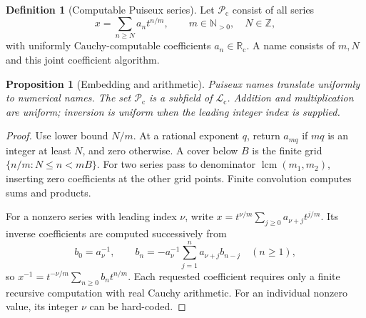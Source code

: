 \documentclass[11pt,letterpaper]{article}
\numberwithin{equation}{section}
\newtheorem{proposition}[theorem]{Proposition}
\theoremstyle{definition}
\newtheorem{definition}[theorem]{Definition}
\theoremstyle{remark}
\newcommand{\Rc}{\mathbb R_{\mathrm c}}
\newcommand{\Lc}{\mathcal L_{\mathrm c}}
\newcommand{\Pc}{\mathcal P_{\mathrm c}}
\newcommand{\N}{\mathbb N}
\newcommand{\Z}{\mathbb Z}
\DeclareMathOperator{\lcm}{lcm}
\begin{document}
\begin{definition}[Computable Puiseux series]
\label{def:puiseux}
Let $\Pc$ consist of all series
\begin{equation}\label{eq:Puiseux}
 x=\sum_{n\ge N}a_nt^{n/m},
 \qquad m\in\N_{>0},\quad N\in\Z,
\end{equation}
with uniformly Cauchy-computable coefficients $a_n\in\Rc$. A name consists
of $m,N$ and this joint coefficient algorithm.
\end{definition}

\begin{proposition}[Embedding and arithmetic]
\label{prop:puiseuxarithmetic}
Puiseux names translate uniformly to numerical names. The set $\Pc$ is a
subfield of $\Lc$. Addition and multiplication are uniform; inversion is
uniform when the leading integer index is supplied.
\end{proposition}
\begin{proof}
Use lower bound $N/m$. At a rational exponent $q$, return $a_{mq}$ if
$mq$ is an integer at least $N$, and zero otherwise. A cover below $B$ is
the finite grid $\{n/m:N\le n<mB\}$. For two series pass to denominator
$\lcm(m_1,m_2)$, inserting zero coefficients at the other grid points.
Finite convolution computes sums and products.

For a nonzero series with leading index $\nu$, write
$x=t^{\nu/m}\sum_{j\ge0}a_{\nu+j}t^{j/m}$. Its inverse coefficients are
computed successively from
\begin{equation}\label{eq:inverseRecurrence}
 b_0=a_\nu^{-1},\qquad
 b_n=-a_\nu^{-1}\sum_{j=1}^n a_{\nu+j}b_{n-j}\quad(n\ge1),
\end{equation}
so $x^{-1}=t^{-\nu/m}\sum_{n\ge0}b_nt^{n/m}$. Each requested coefficient
requires only a finite recursive computation with real Cauchy arithmetic.
For an individual nonzero value, its integer $\nu$ can be hard-coded.
\end{proof}
\end{document}
